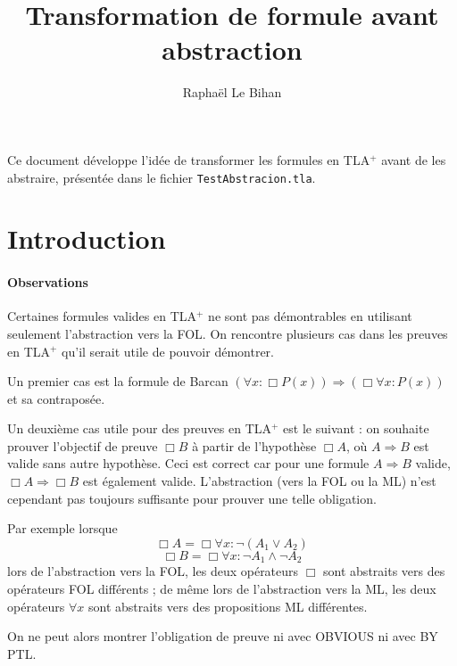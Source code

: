 \documentclass[12pt]{article}
\title{Transformation de formule avant abstraction}
\author{Raphaël Le Bihan}
\begin{document}
\maketitle

Ce document développe l'idée de transformer les formules en TLA$^+$ avant de les abstraire, présentée dans le fichier \texttt{TestAbstracion.tla}.

\section{Introduction}


\paragraph{Observations}

Certaines formules valides en TLA$^+$ ne sont pas démontrables en utilisant seulement l'abstraction vers la FOL.
On rencontre plusieurs cas dans les preuves en TLA$^+$ qu'il serait utile de pouvoir démontrer.

Un premier cas est la formule de Barcan $(\forall x : \Box P(x)) \Rightarrow (\Box \forall x : P(x))$ et sa contraposée.

Un deuxième cas utile pour des preuves en TLA$^+$ est le suivant :
on souhaite prouver l'objectif de preuve $\Box B$ à partir de l'hypothèse $\Box A$, où $A \Rightarrow B$ est valide sans autre hypothèse.
Ceci est correct car pour une formule $A \Rightarrow B$ valide, $\Box A \Rightarrow \Box B$ est également valide.
L'abstraction (vers la FOL ou la ML) n'est cependant pas toujours suffisante pour prouver une telle obligation.

Par exemple lorsque
\[ \Box A = \Box \forall x : \neg (A_1 \lor A_2) \]
\[ \Box B = \Box \forall x : \neg A_1 \land \neg A_2\]
lors de l'abstraction vers la FOL, les deux opérateurs $\Box$ sont abstraits vers des opérateurs FOL différents ; de même lors de l'abstraction vers la ML, les deux opérateurs $\forall x$ sont abstraits vers des propositions ML différentes.

On ne peut alors montrer l'obligation de preuve ni avec OBVIOUS ni avec BY PTL.

\begin{comment}
Remarque : Ici on raisonnera sur des formules TLA$^+$ et pas sur des formules FOML.
Dans la FOML l'interprétation du symbole $\nabla$ n'est pas connue,
les transformations que l'on peut effectuer sur une formule FOML tout
en gardant des formules équivalentes sont donc moindres par rapport aux transformations sur les formules TLA$^+$.
\end{comment}
\end{document}

